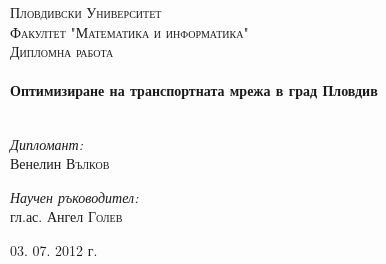 
\begin{titlepage}

\begin{center}

\textsc{\LARGE Пловдивски Университет}\\[1.5cm]
\textsc{\LARGE Факултет "Математика и информатика"}\\[1.0cm]

\textsc{\Large Дипломна работа}\\[0.5cm]

\HRule \\[0.4cm]
{ \huge \bfseries Оптимизиране на транспортната мрежа в град Пловдив}\\[0.4cm]

\HRule \\[1.5cm]

\begin{minipage}{0.4\textwidth}
\begin{flushleft} \large
\emph{Дипломант:}\\
Венелин \textsc{Вълков}
\end{flushleft}
\end{minipage}
\begin{minipage}{0.4\textwidth}
\begin{flushright} \large
\emph{Научен ръководител:} \\
гл.ас. Ангел \textsc{Голев}
\end{flushright}
\end{minipage}

\vfill

{\large 03. 07. 2012 г.}

\end{center}

\end{titlepage}